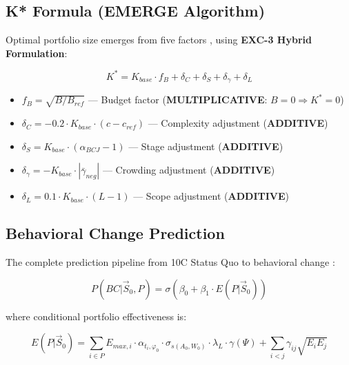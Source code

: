 \subsection{K* Formula (EMERGE Algorithm)}

Optimal portfolio size emerges from five factors \citep{iyengar2000choice, schwartz2004paradox, scheibehenne2010can}, using \textbf{EXC-3 Hybrid Formulation}:

\begin{equation}
\boxed{
K^* = K_{base} \cdot f_B + \delta_C + \delta_S + \delta_\gamma + \delta_L
}
\label{eq:mp-k-optimal}
\end{equation}

\begin{itemize}[nosep]
\item $f_B = \sqrt{B/B_{ref}}$ --- Budget factor (\textbf{MULTIPLICATIVE}: $B=0 \Rightarrow K^*=0$)
\item $\delta_C = -0.2 \cdot K_{base} \cdot (c - c_{ref})$ --- Complexity adjustment (\textbf{ADDITIVE})
\item $\delta_S = K_{base} \cdot (\alpha_{BCJ} - 1)$ --- Stage adjustment (\textbf{ADDITIVE})
\item $\delta_\gamma = -K_{base} \cdot |\bar{\gamma}_{neg}|$ --- Crowding adjustment (\textbf{ADDITIVE})
\item $\delta_L = 0.1 \cdot K_{base} \cdot (L - 1)$ --- Scope adjustment (\textbf{ADDITIVE})
\end{itemize}

\subsection{Behavioral Change Prediction}

The complete prediction pipeline from 10C Status Quo to behavioral change \citep{prochaska1992stages, ajzen1991theory, webb2006meta}:

\begin{equation}
\boxed{
P(BC | \vec{S}_0, P) = \sigma\left( \beta_0 + \beta_1 \cdot E(P | \vec{S}_0) \right)
}
\label{eq:mp-bc-prediction}
\end{equation}

where conditional portfolio effectiveness is:

\begin{equation}
\boxed{
E(P | \vec{S}_0) = \sum_{i \in P} E_{max,i} \cdot \alpha_{t_i,\varphi_0} \cdot \sigma_{s(A_0,W_0)} \cdot \lambda_L \cdot \gamma(\Psi) + \sum_{i<j} \gamma_{ij} \sqrt{E_i E_j}
}
\label{eq:mp-conditional-effectiveness}
\end{equation}

